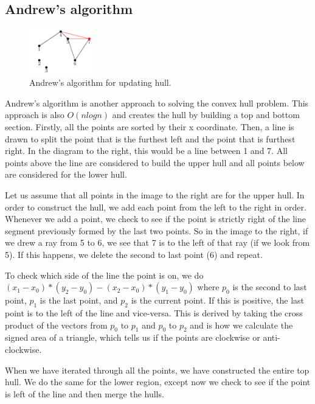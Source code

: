 \documentclass{article}
\begin{document}
\subsection{Andrew's algorithm}

\begin{figure}
  \vspace{-40pt}
  \begin{center}
    \includegraphics[width=0.25\textwidth]{andrews.PNG}
  \end{center}
  \vspace{-10pt}
  \caption{Andrew's algorithm for updating hull.}
  \vspace{-10pt}
\end{figure}

Andrew's algorithm is another approach to solving the convex hull problem. This approach is also $O(n log n)$ and creates the hull by building a top and bottom section. Firstly, all the points are sorted by their x coordinate. Then, a line is drawn to split the point that is the furthest left and the point that is furthest right. In the diagram to the right, this would be a line between 1 and 7. All points above the line are considered to build the upper hull and all points below are considered for the lower hull. 

Let us assume that all points in the image to the right are for the upper hull. In order to construct the hull, we add each point from the left to the right in order. Whenever we add a point, we check to see if the point is strictly right of the line segment previously formed by the last two points. So in the image to the right, if we drew a ray from 5 to 6, we see that 7 is to the left of that ray (if we look from 5). If this happens, we delete the second to last point (6) and repeat.

To check which side of the line the point is on, we do $(x_1-x_0)*(y_2-y_0) - (x_2-x_0)*(y_1-y_0)$ where $p_0$ is the second to last point, $p_1$ is the last point, and $p_2$ is the current point. If this is positive, the last point is to the left of the line and vice-versa. This is derived by taking the cross product of the vectors from $p_0$ to $p_1$ and $p_0$ to $p_2$ and is how we calculate the signed area of a triangle, which tells us if the points are clockwise or anti-clockwise.

When we have iterated through all the points, we have constructed the entire top hull. We do the same for the lower region, except now we check to see if the point is left of the line and then merge the hulls.
\end{document}
